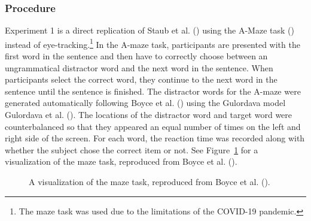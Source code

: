 \documentclass[
  12pt,
  letterpaper,
]{scrreprt}
\begin{document}
\subsubsection{Procedure}\label{procedure}

Experiment 1 is a direct replication of Staub et al.
() using the A-Maze
task () instead
of eye-tracking.\footnote{The maze task was used due to the limitations
  of the COVID-19 pandemic.} In the A-maze task, participants are
presented with the first word in the sentence and then have to correctly
choose between an ungrammatical distractor word and the next word in the
sentence. When participants select the correct word, they continue to
the next word in the sentence until the sentence is finished. The
distractor words for the A-maze were generated automatically following
Boyce et al. () using the
Gulordava model Gulordava et al.
(). The
locations of the distractor word and target word were counterbalanced so
that they appeared an equal number of times on the left and right side
of the screen. For each word, the reaction time was recorded along with
whether the subject chose the correct item or not. See
Figure~\ref{fig-mazevisualization} for a visualization of the maze task,
reproduced from Boyce et al.
().

\begin{figure}[htbp]

\caption{\label{fig-mazevisualization}A visualization of the maze task,
reproduced from Boyce et al.
().}


\end{figure}%
\end{document}
